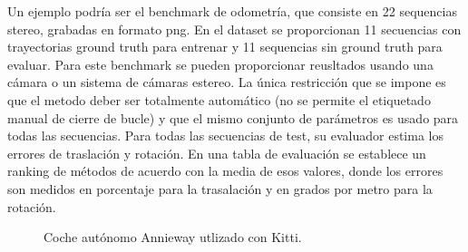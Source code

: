 Un ejemplo podría ser el benchmark de odometría, que consiste en 22 sequencias stereo, grabadas en formato png. En el dataset se proporcionan 11 secuencias con trayectorias ground truth para entrenar y 11 sequencias sin ground truth para evaluar. Para este benchmark se pueden proporcionar reusltados usando una cámara o un sistema de cámaras estereo.
La única restricción que se impone es que el metodo deber ser totalmente automático (no se permite el etiquetado manual de cierre de bucle) y que el mismo conjunto de parámetros es usado para todas las secuencias.
Para todas las secuencias de test, su evaluador estima los errores de traslación y rotación. En una tabla de evaluación se establece un ranking de métodos de acuerdo con la media de esos valores, donde los errores son medidos en porcentaje para la trasalación y en grados por metro para la rotación.
\begin{figure}[H]
\begin{center}
\end{center}
\caption{Coche autónomo Annieway utlizado con Kitti.}
\end{figure}

